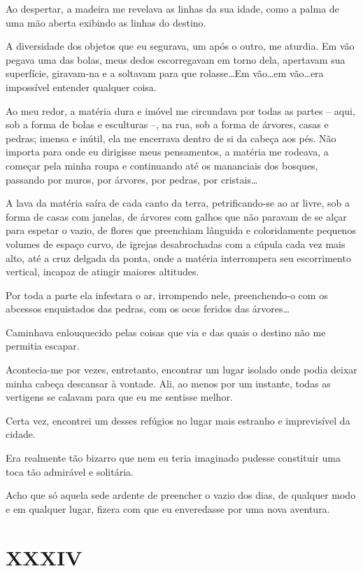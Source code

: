 Ao despertar, a madeira me revelava as linhas da sua idade, como a palma de uma mão aberta exibindo as linhas do destino.

A diversidade dos objetos que eu segurava, um após o outro, me aturdia. Em vão pegava uma das bolas, meus dedos escorregavam em torno dela, apertavam sua superfície, giravam-na e a soltavam para que rolasse\dots Em vão\dots em vão\dots era impossível entender qualquer coisa.

Ao meu redor, a matéria dura e imóvel me circundava por todas as partes -- aqui, sob a forma de bolas e esculturas --, na rua, sob a forma de árvores, casas e pedras; imensa e inútil, ela me encerrava dentro de si da cabeça aos pés. Não importa para onde eu dirigisse meus pensamentos, a matéria me rodeava, a começar pela minha roupa e continuando até os mananciais dos bosques, passando por muros, por árvores, por pedras, por cristais\dots

A lava da matéria saíra de cada canto da terra, petrificando-se ao ar livre, sob a forma de casas com janelas, de árvores com galhos que não paravam de se alçar para espetar o vazio, de flores que preenchiam lânguida e coloridamente pequenos volumes de espaço curvo, de igrejas desabrochadas com a cúpula cada vez mais alto, até a cruz delgada da ponta, onde a matéria interrompera seu escorrimento vertical, incapaz de atingir maiores altitudes.

Por toda a parte ela infestara o ar, irrompendo nele, preenchendo-o com os abcessos enquistados das pedras, com os ocos feridos das árvores\dots

Caminhava enlouquecido pelas coisas que via e das quais o destino não me permitia escapar.

Acontecia-me por vezes, entretanto, encontrar um lugar isolado onde podia deixar minha cabeça descansar à vontade. Ali, ao menos por um instante, todas as vertigens se calavam para que eu me sentisse melhor.

Certa vez, encontrei um desses refúgios no lugar mais estranho e imprevisível da cidade.

Era realmente tão bizarro que nem eu teria imaginado pudesse constituir uma toca tão admirável e solitária.

Acho que só aquela sede ardente de preencher o vazio dos dias, de qualquer modo e em qualquer lugar, fizera com que eu enveredasse por uma nova aventura.


\chapter*{\centering\Large{XXXIV}}

